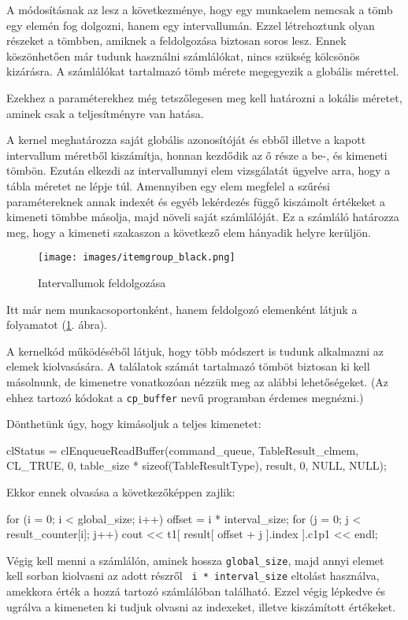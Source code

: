 A módosításnak az lesz a következménye, hogy egy munkaelem nemcsak a tömb egy elemén fog dolgozni, hanem egy intervallumán. Ezzel létrehoztunk olyan részeket a tömbben, amiknek a feldolgozása biztosan soros lesz. Ennek köszönhetően már tudunk használni számlálókat, nincs szükség kölcsönös kizárásra. A számlálókat tartalmazó tömb mérete megegyezik a globális mérettel.

Ezekhez a paraméterekhez még tetszőlegesen meg kell határozni a lokális méretet, aminek csak a teljesítményre van hatása.


A kernel meghatározza saját globális azonosítóját és ebből illetve a kapott intervallum méretből kiszámítja, honnan kezdődik az ő része a be-, és kimeneti tömbön. Ezután elkezdi az intervallumnyi elem vizsgálatát ügyelve arra, hogy a tábla méretet ne lépje túl. Amennyiben egy elem megfelel a szűrési paramétereknek annak indexét és egyéb lekérdezés függő kiszámolt értékeket a kimeneti tömbbe másolja, majd növeli saját számlálóját. Ez a számláló határozza meg, hogy a kimeneti szakaszon a következő elem hányadik helyre kerüljön.

\begin{figure}[h!]
\centering
\texttt{[image: images/itemgroup\_black.png]}
\caption{Intervallumok feldolgozása}
\label{fig:itemgroup_black}
\end{figure}

Itt már nem munkacsoportonként, hanem feldolgozó elemenként látjuk a folyamatot (\ref{fig:itemgroup_black}. ábra).


A kernelkód működéséből látjuk, hogy több módszert is tudunk alkalmazni az elemek kiolvasására. A találatok számát tartalmazó tömböt biztosan ki kell másolnunk, de kimenetre vonatkozóan nézzük meg az alábbi lehetőségeket. (Az ehhez tartozó kódokat a \texttt{cp\_buffer} nevű programban érdemes megnézni.)


Dönthetünk úgy, hogy kimásoljuk a teljes kimenetet:
\begin{python}
clStatus = clEnqueueReadBuffer(command_queue, TableResult_clmem, 
    CL_TRUE, 0, table_size * sizeof(TableResultType), result, 
    0, NULL, NULL);
\end{python}
Ekkor ennek olvasása a következőképpen zajlik:
\begin{python}
for (i = 0; i < global_size; i++)
{
    offset = i * interval_size;
    for (j = 0; j < result_counter[i]; j++)
        cout << t1[ result[ offset + j ].index ].c1p1 << endl;
}
\end{python}
Végig kell menni a számlálón, aminek hossza \texttt{global\_size}, majd annyi elemet kell sorban kiolvasni az adott részről \texttt{ i * interval\_size} eltolást használva, amekkora érték a hozzá tartozó számlálóban található. Ezzel végig lépkedve és ugrálva a kimeneten ki tudjuk olvasni az indexeket, illetve kiszámított értékeket.

